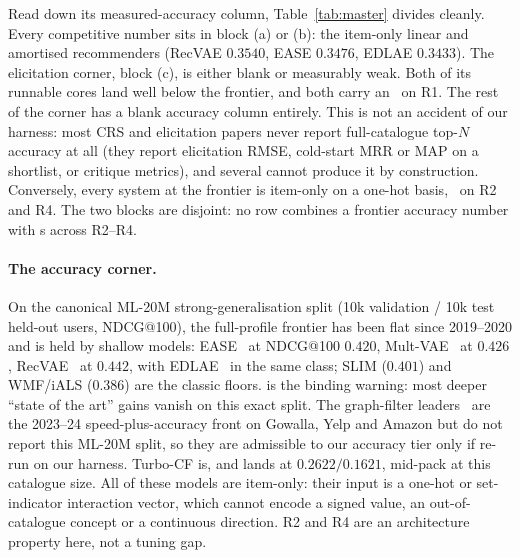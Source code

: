\documentclass[manuscript,screen]{acmart}
\newcommand{\cmark}{\ding{51}}
\newcommand{\xmark}{\ding{55}}
\begin{document}
Read down its measured-accuracy column, Table~\ref{tab:master} divides cleanly. Every competitive number sits in block (a) or (b): the item-only linear and amortised recommenders (RecVAE $0.3540$, EASE $0.3476$, EDLAE $0.3433$). The elicitation corner, block (c), is either blank or measurably weak. Both of its runnable cores land well below the frontier, and both carry an \xmark\ on R1. The rest of the corner has a blank accuracy column entirely. This is not an accident of our harness: most CRS and elicitation papers never report full-catalogue top-$N$ accuracy at all (they report elicitation RMSE, cold-start MRR or MAP on a shortlist, or critique metrics), and several cannot produce it by construction. Conversely, every system at the frontier is item-only on a one-hot basis, \xmark\ on R2 and R4. The two blocks are disjoint: no row combines a frontier accuracy number with \cmark s across R2--R4.

\paragraph{The accuracy corner.} On the canonical ML-20M strong-generalisation split (10k validation / 10k test held-out users, NDCG@100), the full-profile frontier has been flat since 2019--2020 and is held by shallow models: EASE~\citep{steck2019ease} at NDCG@100 $0.420$, Mult-VAE~\citep{liang2018variational} at $0.426$, RecVAE~\citep{ren2020recvae} at $0.442$, with EDLAE~\citep{steck2020edlae} in the same class; SLIM ($0.401$) and WMF/iALS ($0.386$) are the classic floors. \citet{dacrema2019progress} is the binding warning: most deeper ``state of the art'' gains vanish on this exact split. The graph-filter leaders~\citep{shen2021gfcf,choi2023bspm,park2024turbocf} are the 2023--24 speed-plus-accuracy front on Gowalla, Yelp and Amazon but do not report this ML-20M split, so they are admissible to our accuracy tier only if re-run on our harness. Turbo-CF is, and lands at $0.2622/0.1621$, mid-pack at this catalogue size. All of these models are item-only: their input is a one-hot or set-indicator interaction vector, which cannot encode a signed value, an out-of-catalogue concept or a continuous direction. R2 and R4 are an architecture property here, not a tuning gap.
\end{document}
